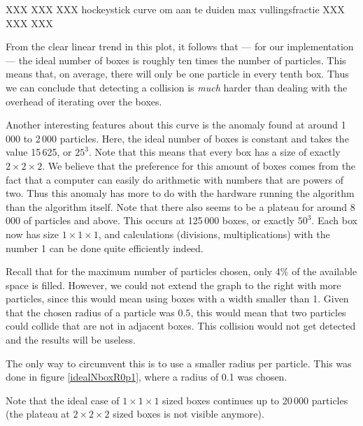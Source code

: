{\LARGE XXX XXX XXX hockeystick curve om aan te duiden max vullingsfractie 
XXX XXX XXX}

From the clear linear trend in this plot, it follows that --- for our 
implementation  --- the ideal number of boxes is roughly ten times the 
number of particles. This means that, on average, there will only be one 
particle in every tenth box. Thus we can conclude that detecting a 
collision is \emph{much} harder than dealing with the overhead of iterating 
over the boxes.

Another interesting features about this curve is the anomaly found at 
around 1\,000 to 2\,000 particles. Here, the ideal number of boxes is 
constant and takes the value 15\,625, or $25^3$. Note that this means that 
every box has a size of exactly $2 \times 2 \times 2$. We believe that the 
preference for this amount of boxes comes from the fact that a computer can 
easily do arithmetic with numbers that are powers of two. Thus this anomaly 
has more to do with the hardware running the algorithm than the algorithm 
itself. Note that there also seems to be a plateau for around 8\,000 of 
particles and above. This occurs at 125\,000 boxes, or exactly $50^3$. Each 
box now has size $1 \times 1 \times 1$, and calculations (divisions, 
multiplications) with the number 1 can be done quite efficiently indeed.

Recall that for the maximum number of particles chosen, only 4\% of the 
available space is filled. However, we could not extend the graph to the 
right with more particles, since this would mean using boxes with a width 
smaller than 1. Given that the chosen radius of a particle was $0.5$, this 
would mean that two particles could collide that are not in adjacent boxes.  
This collision would not get detected and the results will be useless.

The only way to circumvent this is to use a smaller radius per particle.  
This was done in figure \ref{idealNboxR0p1}, where a radius of 0.1 was 
chosen.


Note that the ideal case of $1 \times 1 \times 1$ sized boxes continues up 
to 20\,000 particles (the plateau at $2 \times 2 \times 2$ sized boxes is 
not visible anymore).

